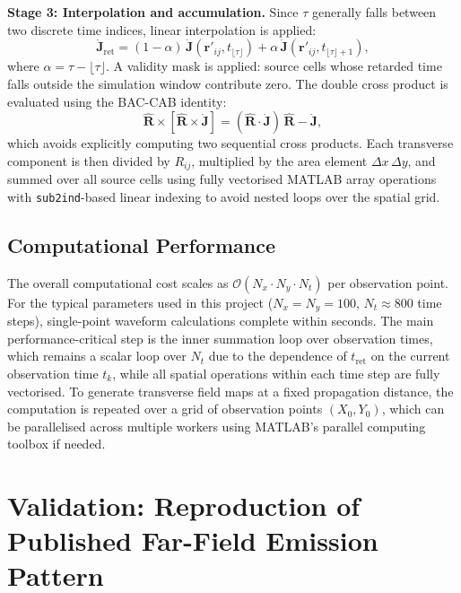 \documentclass[12pt]{interim_report}
\begin{document}
\textbf{Stage 3: Interpolation and accumulation.} Since $\tau$ generally falls between two discrete time indices, linear interpolation is applied:
\begin{equation}
    \dot{\mathbf{J}}_{\mathrm{ret}} = (1 - \alpha)\,\dot{\mathbf{J}}(\mathbf{r}'_{ij}, t_{\lfloor\tau\rfloor}) + \alpha\,\dot{\mathbf{J}}(\mathbf{r}'_{ij}, t_{\lfloor\tau\rfloor+1}),
\end{equation}
where $\alpha = \tau - \lfloor\tau\rfloor$. A validity mask is applied: source cells whose retarded time falls outside the simulation window contribute zero. The double cross product is evaluated using the BAC-CAB identity:
\begin{equation}
    \hat{\mathbf{R}} \times [\hat{\mathbf{R}} \times \dot{\mathbf{J}}] = (\hat{\mathbf{R}} \cdot \dot{\mathbf{J}})\,\hat{\mathbf{R}} - \dot{\mathbf{J}},
\end{equation}
which avoids explicitly computing two sequential cross products. Each transverse component is then divided by $R_{ij}$, multiplied by the area element $\Delta x\,\Delta y$, and summed over all source cells using fully vectorised MATLAB array operations with \texttt{sub2ind}-based linear indexing to avoid nested loops over the spatial grid.

\subsection{Computational Performance}
The overall computational cost scales as $\mathcal{O}(N_x \cdot N_y \cdot N_t)$ per observation point. For the typical parameters used in this project ($N_x = N_y = 100$, $N_t \approx 800$ time steps), single-point waveform calculations complete within seconds. The main performance-critical step is the inner summation loop over observation times, which remains a scalar loop over $N_t$ due to the dependence of $t_{\mathrm{ret}}$ on the current observation time $t_k$, while all spatial operations within each time step are fully vectorised. To generate transverse field maps at a fixed propagation distance, the computation is repeated over a grid of observation points $(X_0, Y_0)$, which can be parallelised across multiple workers using MATLAB's parallel computing toolbox if needed.

\section{Validation: Reproduction of Published Far-Field Emission Pattern}
\end{document}
